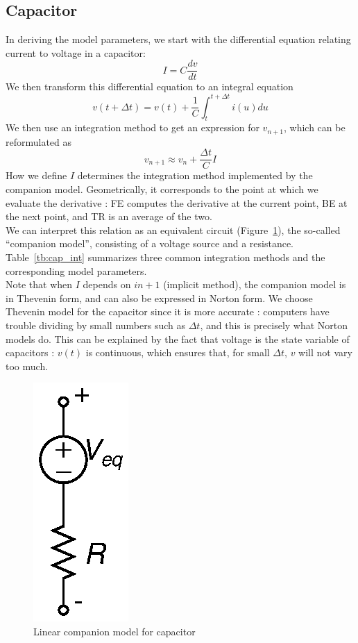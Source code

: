 \documentclass{article}
\begin{document}
\subsection{Capacitor}
In deriving the model parameters, we start with the differential equation relating current to voltage in a capacitor:
\begin{equation}
I=C \frac{dv}{dt}
\end{equation}
We then transform this differential equation to an integral equation 
\begin{equation}
v(t+\Delta t) = v(t) + \frac{1}{C}\int_t^{t+\Delta t} i(u) du
\end{equation}
We then use an integration method to get an expression for $v_{n+1}$, which can be reformulated as
\begin{equation}
v_{n+1} \approx v_n+ \frac{\Delta t}{C}I
\end{equation}
How we define $I$ determines the integration method implemented by the companion model. Geometrically, it corresponds to the point at which we evaluate the derivative : FE computes the derivative at the current point, BE at the next point, and TR is an average of the two. \\
We can interpret this relation as an equivalent circuit (Figure~\ref{fig:cap}), the so-called ``companion model'', consisting of a voltage source and a resistance. Table~\ref{tb:cap_int} summarizes three common integration methods and the corresponding model parameters.\\
Note that when $I$ depends on $i{n+1}$ (implicit method), the companion model is in Thevenin form, and can also be expressed in Norton form. We choose Thevenin model for the capacitor since it is more accurate : computers have trouble dividing by small numbers such as $\Delta t$, and this is precisely what Norton models do. This can be explained by the fact that voltage is the state variable of capacitors : $v(t)$ is continuous, which ensures that, for small $\Delta t$, $v$ will not vary too much.


\begin{figure}[htb!]
\begin{center}
\includegraphics{fig/cap.eps}
\caption{Linear companion model for capacitor \label{fig:cap}}
\end{center}
\end{figure}
\end{document}
